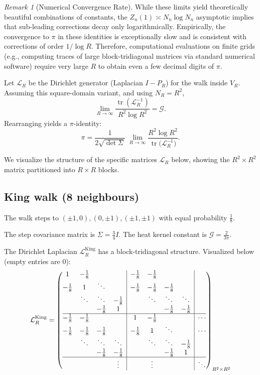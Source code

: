 \documentclass[reqno]{amsart}
\numberwithin{equation}{section}
\theoremstyle{definition}
\theoremstyle{remark}
\newtheorem{remark}[remark]{Remark}
\newcommand{\cG}{\mathcal{G}}
\DeclareMathOperator{\tr}{tr}
\begin{document}
\begin{remark}[Numerical Convergence Rate]\label{rem:convergence_rate}
While these limits yield theoretically beautiful combinations of constants, the $Z_n(1) \asymp N_n \log N_n$ asymptotic implies that sub-leading corrections decay only logarithmically. Empirically, the convergence to $\pi$ in these identities is exceptionally slow and is consistent with corrections of order $1/\log R$. Therefore, computational evaluations on finite grids (e.g., computing traces of large block-tridiagonal matrices via standard numerical software) require very large $R$ to obtain even a few decimal digits of $\pi$.
\end{remark}

Let $ \mathcal{L}_R $ be the Dirichlet generator (Laplacian $I-P_R$) for the walk inside $V_R$.
Assuming this square-domain variant, and using $N_R=R^2$,
\[
\lim_{R\to\infty} \frac{\tr(\mathcal{L}_R^{-1})}{R^2 \log R^2} = \cG.
\]
Rearranging yields a $\pi$-identity:
\[\pi = \frac{1}{2\sqrt{\det\Sigma}}\;\lim_{R\to\infty}\frac{R^{2}\log R^{2}}{\tr\!\bigl(\mathcal{L}_R^{-1}\bigr)}.\]

We visualize the structure of the specific matrices $\mathcal{L}_R$ below, showing the $R^2 \times R^2$ matrix partitioned into $R \times R$ blocks.

\subsection{King walk (8 neighbours)}\label{app:king}

The walk steps to $(\pm1,0),(0,\pm1),(\pm1,\pm1)$ with equal probability $ \tfrac18 $.

The step covariance matrix is $\Sigma = \tfrac{3}{4} I$. The heat kernel constant is $\cG = \frac{2}{3\pi}$.

The Dirichlet Laplacian $\mathcal{L}_R^{\text{King}}$ has a block-tridiagonal structure. Visualized below (empty entries are 0):
\[
\mathcal{L}_R^{\text{King}} =
\left(\begin{array}{@{}cccc|cccc|c@{}}
1 & -\frac{1}{8} & & & -\frac{1}{8} & -\frac{1}{8} & & & \\
-\frac{1}{8} & 1 & \ddots & & -\frac{1}{8} & -\frac{1}{8} & -\frac{1}{8} & & \\
& \ddots & \ddots & -\frac{1}{8} & & \ddots & \ddots & \ddots & \\
& & -\frac{1}{8} & 1 & & & -\frac{1}{8} & -\frac{1}{8} & \\
\hline
-\frac{1}{8} & -\frac{1}{8} & & & 1 & -\frac{1}{8} & & & \cdots \\
-\frac{1}{8} & -\frac{1}{8} & -\frac{1}{8} & & -\frac{1}{8} & 1 & \ddots & & \cdots \\
& \ddots & \ddots & \ddots & & \ddots & \ddots & -\frac{1}{8} & \\
& & -\frac{1}{8} & -\frac{1}{8} & & & -\frac{1}{8} & 1 & \\
\hline
& & & \vdots & & \vdots & & & \ddots
\end{array}\right)_{R^2 \times R^2}
\]
\end{document}
